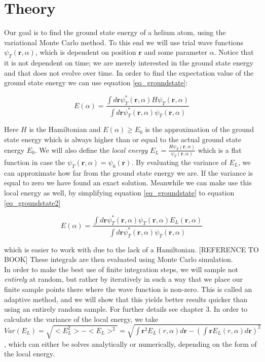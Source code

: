 \section{Theory}

Our goal is to find the ground state energy of a helium atom, using the variational Monte Carlo method. To this end we will use trial wave functions $\psi_T(\textbf{r},\alpha)$, which is dependent on position $\textbf{r}$ and some parameter $\alpha$. Notice that it is not dependent on time; we are merely interested in the ground state energy and that does not evolve over time. In order to find the expectation value of the ground state energy we can use equation \ref{eq_groundstate}: 

\begin{equation}\label{eq_groundstate}
E(\alpha) = \frac{\int d\textbf{r} \psi_T^*(\textbf{r},\alpha)H\psi_T(\textbf{r},\alpha)}{\int d\textbf{r} \psi_T^*(\textbf{r},\alpha)\psi_T(\textbf{r},\alpha)}
\end{equation}

Here $H$ is the Hamiltonian and $E(\alpha) \geq E_0$ is the approximation of the ground state energy which is always higher than or equal to the actual ground state energy $E_0$.  We will also define the \textit{local energy} $E_L = \frac{H\psi_T(\textbf{r},\alpha)}{\psi_T(\textbf{r},\alpha)}$ which is a flat function in case the $\psi_T(\textbf{r},\alpha) = \psi_0(\textbf{r})$. By evaluating the variance of $E_L$, we can approximate how far from the ground state energy we are. If the variance is equal to zero we have found an exact solution. Meanwhile we can make use this local energy as well, by simplifying equation \ref{eq_groundstate} to equation \ref{eq_groundstate2}

\begin{equation}\label{eq_groundstate2}
E(\alpha) = \frac{\int d\textbf{r} \psi_T^*(\textbf{r},\alpha)\psi_T(\textbf{r},\alpha)E_L(\textbf{r},\alpha)}{\int d\textbf{r} \psi_T^*(\textbf{r},\alpha)\psi_T(\textbf{r},\alpha)}
\end{equation}

which is easier to work with due to the lack of a Hamiltonian. [REFERENCE TO BOOK] These integrals are then evaluated using Monte Carlo simulation. \\

In order to make the best use of finite integration steps, we will sample not \textit{entirely} at random, but rather by iteratively in such a way that we place our finite sample points there where the wave function is non-zero. This is called an adaptive method, and we will show that this yields better results quicker than using an entirely random sample. For further details see chapter 3. In order to calculate the variance of the local energy, we take $Var(E_L) = \sqrt{<E_L^2> - <E_L>^2} = \sqrt{ \int \textbf{r}^2 E_L(\textit{r},\alpha) d\textbf{r} - (\int \textbf{r} E_L(\textit{r},\alpha)d\textbf{r})^2 } $, which can either be solves analytically or numerically, depending on the form of the local energy. 